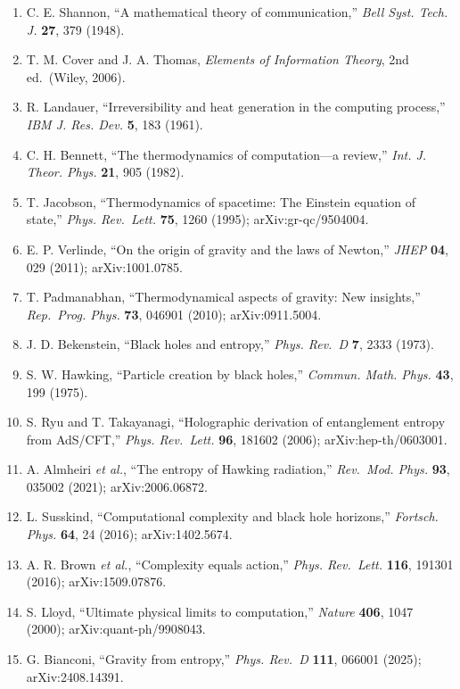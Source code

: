 \documentclass[
  11pt,
]{article}
\providecommand{\tightlist}{%
  \setlength{\itemsep}{0pt}\setlength{\parskip}{0pt}}
\begin{document}
\begin{enumerate}
\def\labelenumi{\arabic{enumi}.}
\tightlist
\item
  C. E. Shannon, ``A mathematical theory of communication,'' \emph{Bell Syst. Tech. J.} \textbf{27}, 379 (1948).
\item
  T. M. Cover and J. A. Thomas, \emph{Elements of Information Theory}, 2nd ed.~(Wiley, 2006).
\item
  R. Landauer, ``Irreversibility and heat generation in the computing process,'' \emph{IBM J. Res. Dev.} \textbf{5}, 183 (1961).
\item
  C. H. Bennett, ``The thermodynamics of computation---a review,'' \emph{Int. J. Theor. Phys.} \textbf{21}, 905 (1982).
\item
  T. Jacobson, ``Thermodynamics of spacetime: The Einstein equation of state,'' \emph{Phys. Rev.~Lett.} \textbf{75}, 1260 (1995); arXiv:gr-qc/9504004.
\item
  E. P. Verlinde, ``On the origin of gravity and the laws of Newton,'' \emph{JHEP} \textbf{04}, 029 (2011); arXiv:1001.0785.
\item
  T. Padmanabhan, ``Thermodynamical aspects of gravity: New insights,'' \emph{Rep.~Prog. Phys.} \textbf{73}, 046901 (2010); arXiv:0911.5004.
\item
  J. D. Bekenstein, ``Black holes and entropy,'' \emph{Phys. Rev.~D} \textbf{7}, 2333 (1973).
\item
  S. W. Hawking, ``Particle creation by black holes,'' \emph{Commun. Math. Phys.} \textbf{43}, 199 (1975).
\item
  S. Ryu and T. Takayanagi, ``Holographic derivation of entanglement entropy from AdS/CFT,'' \emph{Phys. Rev.~Lett.} \textbf{96}, 181602 (2006); arXiv:hep-th/0603001.
\item
  A. Almheiri \emph{et al.}, ``The entropy of Hawking radiation,'' \emph{Rev.~Mod. Phys.} \textbf{93}, 035002 (2021); arXiv:2006.06872.
\item
  L. Susskind, ``Computational complexity and black hole horizons,'' \emph{Fortsch. Phys.} \textbf{64}, 24 (2016); arXiv:1402.5674.
\item
  A. R. Brown \emph{et al.}, ``Complexity equals action,'' \emph{Phys. Rev.~Lett.} \textbf{116}, 191301 (2016); arXiv:1509.07876.
\item
  S. Lloyd, ``Ultimate physical limits to computation,'' \emph{Nature} \textbf{406}, 1047 (2000); arXiv:quant-ph/9908043.
\item
  G. Bianconi, ``Gravity from entropy,'' \emph{Phys. Rev.~D} \textbf{111}, 066001 (2025); arXiv:2408.14391.

\end{enumerate}
\end{document}
